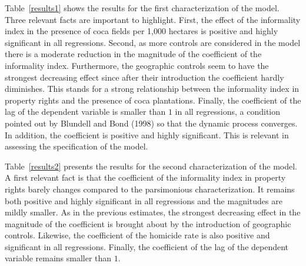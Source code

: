 \documentclass[12pt,a4paper,english]{article}%
\begin{document}
Table~\ref{results1} shows the results for the first characterization of the model. Three relevant facts are important to highlight. First, the effect of the informality index in the presence of coca fields per 1,000 hectares is positive and highly significant in all regressions. Second, as more controls are considered in the model there is a moderate reduction in the magnitude of the coefficient of the informality index. Furthermore, the geographic controls seem to have the strongest decreasing effect since after their introduction the coefficient hardly diminishes. This stands for a strong relationship between the informality index in property rights and the presence of coca plantations. Finally, the coefficient of the lag of the dependent variable is smaller than $1$ in all regressions, a condition pointed out by Blundell and Bond (1998) so that the dynamic process converges. In addition, the coefficient is positive and highly significant. This is relevant in assessing the specification of the model.

Table~\ref{results2} presents the results for the second characterization of the model. A first relevant fact is that the coefficient of the informality index in property rights barely changes compared to the parsimonious characterization. It remains both positive and highly significant in all regressions and the magnitudes are mildly smaller. As in the previous estimates, the strongest decreasing effect in the magnitude of the coefficient is brought about by the introduction of geographic controls. Likewise, the coefficient of the homicide rate is also positive and significant in all regressions. Finally, the coefficient of the lag of the dependent variable remains smaller than $1$.
\end{document}

